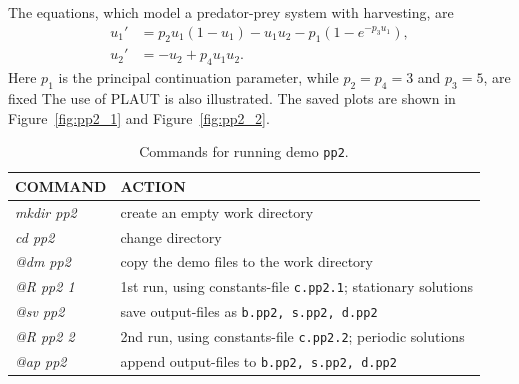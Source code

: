\documentclass[12pt]{report}
\begin{document}
The equations, which model a predator-prey system with harvesting, are
\begin{equation} \begin{array}{cl}
  u_1 ' &= p_2 u_1 (1 - u_1 ) - u_1 u_2 - p_1 (1-e^{-p_3 u_1}) ,\\
  u_2 ' &= -u_2  + p_4 u_1 u_2  .\end{array} \end{equation}
Here $p_1$ is the principal continuation parameter,
while $p_2=p_4=3$ and $p_3=5$, are fixed
The use of {\cal PLAUT} is also illustrated. The saved plots are shown
in Figure~\ref{fig:pp2_1} and  Figure~\ref{fig:pp2_2}.
\begin{table}[htbp]
\begin{center}
\begin{tabular}{| l | l |}
\hline
  COMMAND  & ACTION \\
\hline
  {\it mkdir pp2} & create an empty work directory \\ 
  {\it cd pp2} & change directory \\ 
  {\it @dm pp2} & copy the demo files to the work directory \\ 
\hline
  {\it @R pp2 1} & 1st run, using constants-file {\tt c.pp2.1}; stationary solutions \\ 
  {\it @sv pp2} & save output-files as {\tt b.pp2, s.pp2, d.pp2} \\ 
\hline
  {\it @R pp2 2} & 2nd run, using constants-file {\tt c.pp2.2}; periodic solutions \\ 
  {\it @ap pp2} & append output-files to {\tt b.pp2, s.pp2, d.pp2} \\ 
\hline
\end{tabular}
\caption{Commands for running demo {\tt pp2}.}
\label{tbl:demo_pp2_1}
\end{center}
\end{table}
\end{document}
